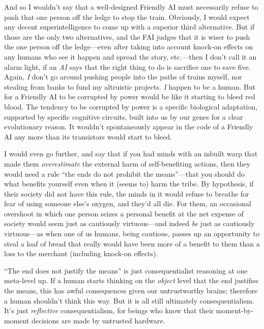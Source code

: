  And so I wouldn't say that a well-designed
Friendly AI must necessarily refuse to push that one person off the
ledge to stop the train. Obviously, I would expect any decent
superintelligence to come up with a superior third alternative. But if
those are the only two alternatives, and the FAI judges that it is
wiser to push the one person off the ledge---even after taking into
account knock-on effects on any humans who see it happen and spread the
story, etc.---then I don't call it an alarm light, if
an \textit{AI} says that the right thing to do is sacrifice one to save
five. Again, \textit{I} don't go around pushing people
into the paths of trains myself, nor stealing from banks to fund my
altruistic projects. \textit{I} happen to be a human. But for a
Friendly AI to be corrupted by power would be like it starting to bleed
red blood. The tendency to be corrupted by power is a specific
biological adaptation, supported by specific cognitive circuits, built
into us by our genes for a clear evolutionary reason. It
wouldn't spontaneously appear in the code of a Friendly
AI any more than its transistors would start to bleed.


 I would even go further, and say that if you had minds with an
inbuilt warp that made them \textit{overestimate} the external harm of
self-benefiting actions, then they would need a rule
``the ends do not prohibit the
means''---that you should do what benefits yourself
even when it (seems to) harm the tribe. By hypothesis, if their society
did not have this rule, the minds in it would refuse to breathe for
fear of using someone else's oxygen, and
they'd all die. For them, an occasional overshoot in
which one person seizes a personal benefit at the net expense of
society would seem just as cautiously virtuous---and indeed \textit{be}
just as cautiously virtuous---as when one of us humans, being cautious,
passes up an opportunity to steal a loaf of bread that really would
have been more of a benefit to them than a loss to the merchant
(including knock-on effects).


 ``The end does not justify the
means'' is just consequentialist reasoning at one
meta-level up. If a human starts thinking on the \textit{object} level
that the end justifies the means, this has awful consequences given our
untrustworthy brains; therefore a human shouldn't think
this way. But it is all still ultimately consequentialism.
It's just \textit{reflective} consequentialism, for
beings who know that their moment-by-moment decisions are made by
untrusted hardware.

